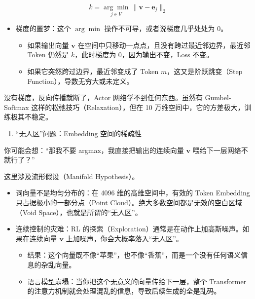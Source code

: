 \[
k
=
\underset{j\in V}{\arg\min}\,
\lVert \mathbf{v}-\mathbf{e}_j\rVert_2
\]

\begin{itemize}
\tightlist
\item
  梯度的噩梦：这个 \(\arg\min\) 操作不可导，或者说梯度几乎处处为 0。

  \begin{itemize}
  \tightlist
  \item
    如果输出向量 \(\mathbf{v}\) 在空间中只移动一点点，且没有跨过最近邻边界，最近邻 Token 仍然是 \(k\)，此时梯度为 0，因为输出不变，Loss 不变。
  \item
    如果它突然跨过边界，最近邻变成了 Token \(m\)，这又是阶跃跳变（Step Function），导数无穷大或未定义。
  \end{itemize}
\end{itemize}

没有梯度，反向传播就断了，Actor 网络学不到任何东西。虽然有 Gumbel-Softmax 这样的松弛技巧（Relaxation），但在 10 万维空间中，它的方差极大，训练极其不稳定。

\begin{enumerate}
\def\labelenumi{\arabic{enumi}.}
\setcounter{enumi}{1}
\tightlist
\item
  ``无人区''问题：Embedding 空间的稀疏性
\end{enumerate}

你可能会想：``那我不要 argmax，我直接把输出的连续向量 \(\mathbf{v}\) 喂给下一层网络不就行了？''

这里涉及流形假设（Manifold Hypothesis）。

\begin{itemize}
\tightlist
\item
  词向量不是均匀分布的：在 4096 维的高维空间中，有效的 Token Embedding 只占据极小的一部分点（Point Cloud）。绝大多数空间都是无效的空白区域（Void Space），也就是所谓的``无人区''。
\item
  连续控制的灾难：RL 的探索（Exploration）通常是在动作上加高斯噪声。如果在连续向量 \(\mathbf{v}\) 上加噪声，你会大概率落入``无人区''。

  \begin{itemize}
  \tightlist
  \item
    结果：这个向量既不像``苹果''，也不像``香蕉''，而是一个没有任何语义信息的杂乱向量。
  \item
    语言模型崩塌：当你把这个无意义的向量传给下一层，整个 Transformer 的注意力机制就会处理混乱的信息，导致后续生成的全是乱码。
  \end{itemize}
\end{itemize}


